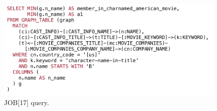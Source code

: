 
\begin{figure}[ht]
    \centering
    \includegraphics[width=\linewidth]{./figures/job17a-query.pdf}
    \caption{JOB[17] query.}
    \label{fig:job17-query}
\end{figure}


